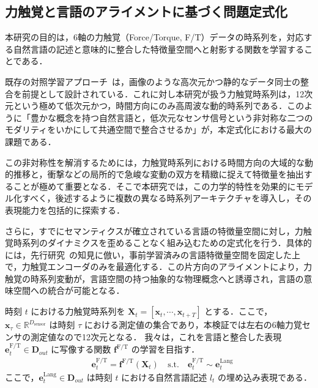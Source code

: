 \documentclass[Japanese]{dicomopapers}
\begin{document}
\subsection{力触覚と言語のアライメントに基づく問題定式化}
本研究の目的は，6軸の力触覚（Force/Torque, F/T）データの時系列を，対応する自然言語の記述と意味的に整合した特徴量空間へと射影する関数を学習することである．

既存の対照学習アプローチ~\cite{CLIP, CLTP, BindingTouch}は，画像のような高次元かつ静的なデータ同士の整合を前提として設計されている．これに対し本研究が扱う力触覚時系列は，12次元という極めて低次元かつ，時間方向にのみ高周波な動的時系列である．このように「豊かな概念を持つ自然言語と，低次元なセンサ信号という非対称な二つのモダリティをいかにして共通空間で整合させるか」が，本定式化における最大の課題である．

この非対称性を解消するためには，力触覚時系列における時間方向の大域的な動的推移と，衝撃などの局所的で急峻な変動の双方を精緻に捉えて特徴量を抽出することが極めて重要となる．そこで本研究では，この力学的特性を効果的にモデル化すべく，後述するように複数の異なる時系列アーキテクチャを導入し，その表現能力を包括的に探索する．

さらに，すでにセマンティクスが確立されている言語の特徴量空間に対し，力触覚時系列のダイナミクスを歪めることなく組み込むための定式化を行う．具体的には，先行研究~\cite{CLTP, BindingTouch}の知見に倣い，事前学習済みの言語特徴量空間を固定した上で，力触覚エンコーダのみを最適化する．この片方向のアライメントにより，力触覚の時系列変動が，言語空間の持つ抽象的な物理概念へと誘導され，言語の意味空間への統合が可能となる．

時刻 $t$ における力触覚時系列を $\mathbf{X}_t = [\mathbf{x}_t, \cdots, \mathbf{x}_{t+T}]$ とする．ここで，$\mathbf{x}_\tau \in \mathbb{R}^{D_\text{sensor}}$ は時刻 $\tau$ における測定値の集合であり，本検証では左右の6軸力覚センサの測定値なので12次元となる．
我々は，これを言語と整合した表現 $\mathbf{e}^\text{F/T}_t \in \mathbf{D}_{out}$ に写像する関数 $\mathbf{f}^\text{F/T}$ の学習を目指す．
\begin{align*}
&\mathbf{e}^\text{F/T}_t = \mathbf{f}^\text{F/T}(\mathbf{X}_t) \
&\text{s.t.} \quad \mathbf{e}^\text{F/T}_t \sim \mathbf{e}^\text{Lang}_t
\end{align*}
ここで，$\mathbf{e}^\text{Lang}_t \in \mathbf{D}_{out}$ は時刻 $t$ における自然言語記述 $l_t$ の埋め込み表現である．
\end{document}
